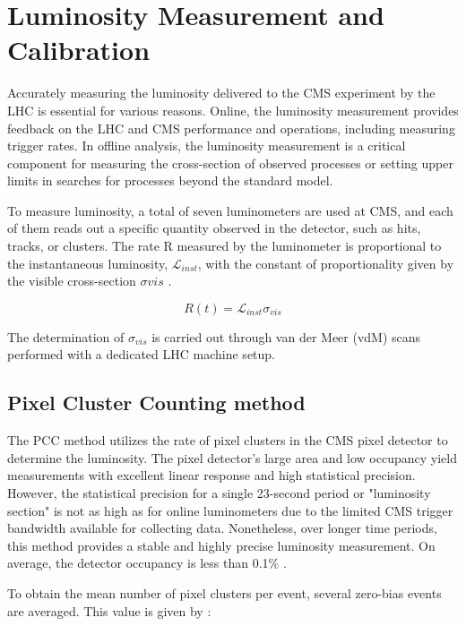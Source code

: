 \chapter{Luminosity  Measurement and Calibration}
\label{ch3}

Accurately measuring the luminosity delivered to the CMS experiment by the LHC is essential for various reasons. Online, the luminosity measurement provides feedback on the LHC and CMS performance and operations, including measuring trigger rates. In offline analysis, the luminosity measurement is a critical component for measuring the cross-section of observed processes or setting upper limits in searches for processes beyond the standard model.

To measure luminosity, a total of seven luminometers are used at CMS, and each of them reads out a specific quantity observed in the detector, such as hits, tracks, or clusters. The rate R measured by the luminometer is proportional to the instantaneous luminosity, $\mathcal{L}_{inst}$, with the constant of proportionality given by the visible cross-section $\sigma{vis}$ \cite{pas_18}.

\begin{equation}
R(t)=\mathcal{L}_{inst}\sigma_{vis}
\label{lumi_exp_gen}
\end{equation}

The determination of $\sigma_{vis}$ is carried out through van der Meer (vdM) scans performed with a dedicated LHC machine setup.

\section{Pixel Cluster Counting method}

The PCC method utilizes the rate of pixel clusters in the CMS pixel detector to determine the luminosity. The pixel detector's large area and low occupancy yield measurements with excellent linear response and high statistical precision. However, the statistical precision for a single 23-second period or "luminosity section" is not as high as for online luminometers due to the limited CMS trigger bandwidth available for collecting data. Nonetheless, over longer time periods, this method provides a stable and highly precise luminosity measurement. On average, the detector occupancy is less than 0.1\% \cite{pas_18}.

To obtain the mean number of pixel clusters per event, several zero-bias events are averaged. This value is given by :

